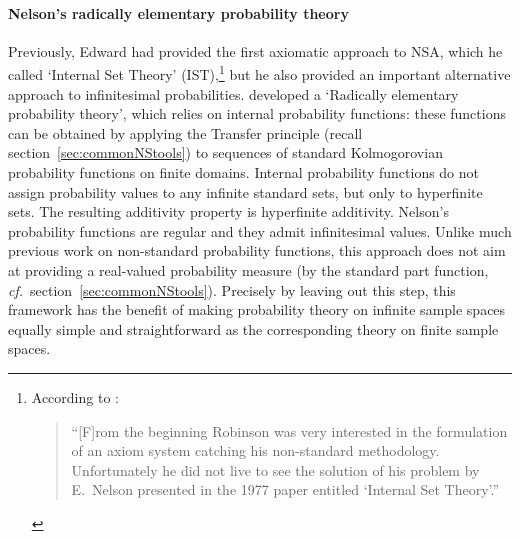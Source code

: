 \paragraph{Nelson's radically elementary probability theory}
Previously, Edward \citet{Nelson:1977} had provided the first axiomatic approach to NSA, which he called `Internal Set Theory' (IST),\footnote{According to \citet[p.~xi]{Luxemburg:2007}:
\begin{quote}
``[F]rom the beginning Robinson was very interested in the formulation of an axiom system catching his non-standard methodology. Unfortunately he did not live to see the solution of his problem by E.~Nelson presented in the 1977 paper entitled `Internal Set Theory'.''
\end{quote}}
but he also provided an important alternative approach to infinitesimal probabilities. \citet{Nelson:1987} developed a `Radically elementary probability theory', which relies on internal probability functions: these functions can be obtained by applying the Transfer principle (recall section~\ref{sec:commonNStools}) to sequences of standard Kolmogorovian probability functions on finite domains. Internal probability functions do not assign probability values to any infinite standard sets, but only to hyperfinite sets. The resulting additivity property is hyperfinite additivity.
Nelson's probability functions are regular and they admit infinitesimal values. Unlike much previous work on non-standard probability functions, this approach does not aim at providing a real-valued probability measure (by the standard part function, \textit{cf.}\ section~\ref{sec:commonNStools}). Precisely by leaving out this step, this framework has the benefit of making probability theory on infinite sample spaces equally simple and straightforward as the corresponding theory on finite sample spaces.
